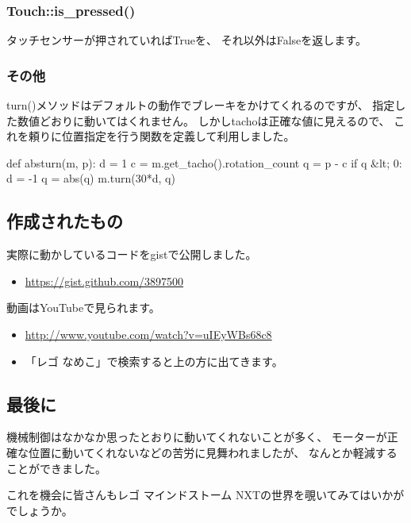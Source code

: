\documentclass[mingoth,a4paper]{jsarticle}
\begin{document}
\subsubsection{Touch::is\_pressed()}
タッチセンサーが押されていればTrueを、
それ以外はFalseを返します。

\subsubsection{その他}
turn()メソッドはデフォルトの動作でブレーキをかけてくれるのですが、
指定した数値どおりに動いてはくれません。
しかしtachoは正確な値に見えるので、
これを頼りに位置指定を行う関数を定義して利用しました。

\begin{commandline}
def absturn(m, p):
    d = 1
    c = m.get_tacho().rotation_count
    q = p - c
    if q &lt; 0:
        d = -1
        q = abs(q)
    m.turn(30*d, q)
\end{commandline}

\subsection{作成されたもの}

実際に動かしているコードをgistで公開しました。
\begin{itemize}
\item \url{https://gist.github.com/3897500}
\end{itemize}

動画はYouTubeで見られます。
\begin{itemize}
\item \url{http://www.youtube.com/watch?v=uIEyWBs68c8}
\item 「レゴ なめこ」で検索すると上の方に出てきます。
\end{itemize}

\subsection{最後に}
機械制御はなかなか思ったとおりに動いてくれないことが多く、
モーターが正確な位置に動いてくれないなどの苦労に見舞われましたが、
なんとか軽減することができました。

これを機会に皆さんもレゴ マインドストーム NXTの世界を覗いてみてはいかがでしょうか。

\end{document}
